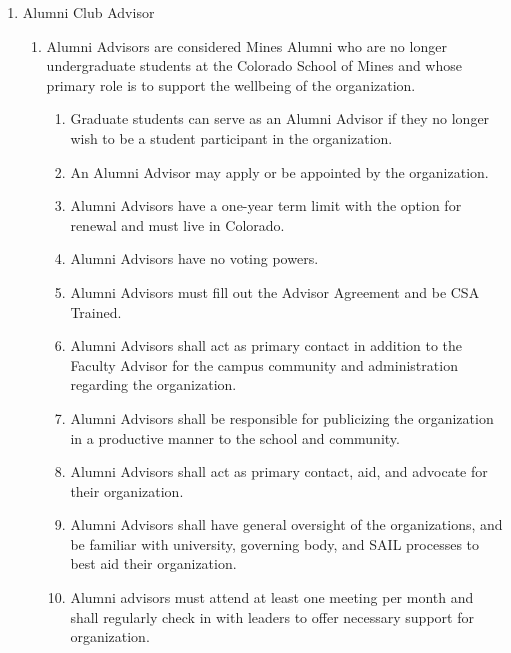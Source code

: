 \documentclass[12pt,letterpaper]{article}
\begin{document}
\begin{enumerate}[label=\Alph*.]
    \item Alumni Club Advisor
    \begin{enumerate}[label=\arabic*)]
        \item Alumni Advisors are considered Mines Alumni who are no longer undergraduate students at the Colorado School of Mines and whose primary role is to support the wellbeing of the organization. 
        \begin{enumerate}[label=\roman*.]
            \item Graduate students can serve as an Alumni Advisor if they no longer wish to be a student participant in the organization. 
            \item An Alumni Advisor may apply or be appointed by the organization.
            \item Alumni Advisors have a one-year term limit with the option for renewal and must live in Colorado. 
            \item Alumni Advisors have no voting powers. 
            \item Alumni Advisors must fill out the Advisor Agreement and be CSA Trained. 
            \item Alumni Advisors shall act as primary contact in addition to the Faculty Advisor for the campus community and administration regarding the organization. 
            \item Alumni Advisors shall be responsible for publicizing the organization in a productive manner to the school and community. 
            \item Alumni Advisors shall act as primary contact, aid, and advocate for their organization. 
            \item Alumni Advisors shall have general oversight of the organizations, and be familiar with university, governing body, and SAIL processes to best aid their organization. 
            \item Alumni advisors must attend at least one meeting per month and shall regularly check in with leaders to offer necessary support for organization. 
        \end{enumerate}
    \end{enumerate}
\end{enumerate}
\end{document}
